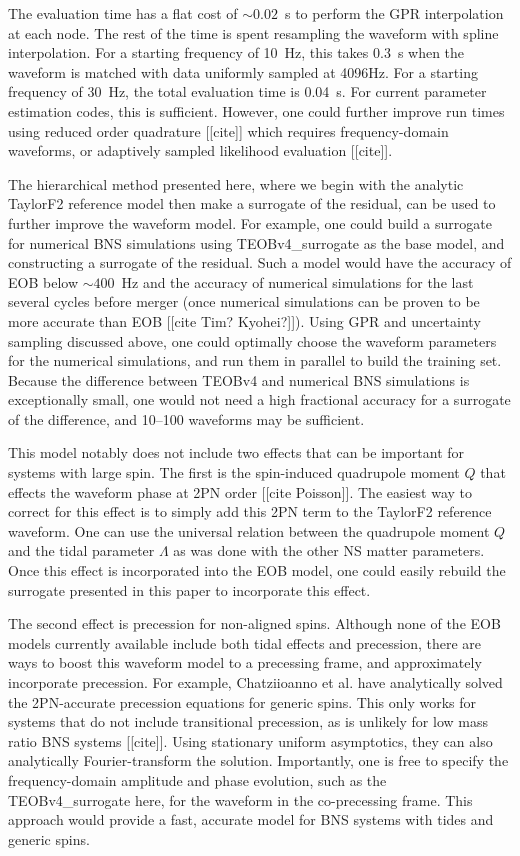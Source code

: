 \documentclass[prd,aps,letter,twocolumn,floatfix,notitlepage,nofootinbib]{revtex4-1}
\begin{document}
The evaluation time has a flat cost of $\sim 0.02$~s to perform the GPR interpolation at each node. The rest of the time is spent resampling the waveform with spline interpolation. For a starting frequency of 10~Hz, this takes 0.3~s when the waveform is matched with data uniformly sampled at 4096Hz. For a starting frequency of 30~Hz, the total evaluation time is 0.04~s. For current parameter estimation codes, this is sufficient. However, one could further improve run times using reduced order quadrature [[cite]] which requires frequency-domain waveforms, or adaptively sampled likelihood evaluation [[cite]].

The hierarchical method presented here, where we begin with the analytic TaylorF2 reference model then make a surrogate of the residual, can be used to further improve the waveform model. For example, one could build a surrogate for numerical BNS simulations using TEOBv4\_surrogate as the base model, and constructing a surrogate of the residual. Such a model would have the accuracy of EOB below $\sim 400$~Hz and the accuracy of numerical simulations for the last several cycles before merger (once numerical simulations can be proven to be more accurate than EOB [[cite Tim? Kyohei?]]). Using GPR and uncertainty sampling discussed above, one could optimally choose the waveform parameters for the numerical simulations, and run them in parallel to build the training set. Because the difference between TEOBv4 and numerical BNS simulations is exceptionally small, one would not need a high fractional accuracy for a surrogate of the difference, and 10--100 waveforms may be sufficient.

This model notably does not include two effects that can be important for systems with large spin. The first is the spin-induced quadrupole moment $Q$ that effects the waveform phase at 2PN order [[cite Poisson]]. The easiest way to correct for this effect is to simply add this 2PN term to the TaylorF2 reference waveform. One can use the universal relation between the quadrupole moment $Q$ and the tidal parameter $\Lambda$ as was done with the other NS matter parameters. Once this effect is incorporated into the EOB model, one could easily rebuild the surrogate presented in this paper to incorporate this effect.

The second effect is precession for non-aligned spins. Although none of the EOB models currently available include both tidal effects and precession, there are ways to boost this waveform model to a precessing frame, and approximately incorporate precession. For example, Chatziioanno et al. have analytically solved the 2PN-accurate precession equations for generic spins. This only works for systems that do not include transitional precession, as is unlikely for low mass ratio BNS systems [[cite]]. Using stationary uniform asymptotics, they can also analytically Fourier-transform the solution. Importantly, one is free to specify the frequency-domain amplitude and phase evolution, such as the TEOBv4\_surrogate here, for the waveform in the co-precessing frame. This approach would provide a fast, accurate model for BNS systems with tides and generic spins.
\end{document}
